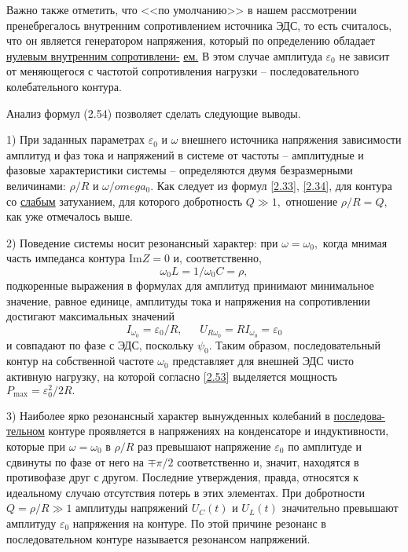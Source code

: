{Важно также отметить, что <<по умолчанию>> в нашем рассмотрении пренебрегалось внут\-ренним сопротивлением источника ЭДС, то есть считалось, что он является \textsf{генератором на\-пряжения,} который по определению обладает \underline{нулевым внутренним со\-про\-тив\-ле\-ни-} \underline{ем.} В этом случае амплитуда $\varepsilon_0$ не зависит от меняющегося с частотой сопротивления нагрузки – последовательного колебательного контура.

Анализ формул (2.54) позволяет сделать следующие выводы.

1) При заданных параметрах $\varepsilon_0$ и $\omega$ внешнего источника напряжения зависимости амплитуд и фаз тока и напряжений в системе от частоты – \textsf{амплитудные} и \textsf{фазовые характеристики сис\-темы} – определяются двумя безразмерными величинами: $\rho/R$ и $\omega/omega_0.$ Как следует из формул \eqref{2.33}, \eqref{2.34}, для контура со \underline{слабым} затуханием, для которого добротность $Q\gg1,$ отношение $\rho/R=Q,$ как уже отмечалось выше.

2) Поведение системы носит резонансный характер: при $\omega=\omega_0,$ когда мнимая часть импеданса контура $\text{Im}Z=0$ и, соответственно,
\setcounter{equation}{54}
\begin{equation}\label{2.55}
	\omega_0L=1/\omega_0C=\rho,
\end{equation}
подкоренные выражения в формулах для амплитуд принимают минимальное значение, равное единице, амплитуды тока и напряжения на сопротивлении достигают максимальных значений
\begin{equation}\label{2.56}
	I_{\omega_0}=\varepsilon_0/R,~~~~~~~U_{R\omega_0}=RI_{\omega_0}=\varepsilon_0
\end{equation}
и совпадают по фазе с ЭДС, поскольку $\psi_0.$ Таким образом, последовательный контур на собственной частоте $\omega_0$ представляет для внешней ЭДС чисто активную нагрузку, на которой согласно \eqref{2.53} выделяется мощность $P_{\text{max}}=\varepsilon_0^2/2R.$

3) Наиболее ярко резонансный характер вынужденных колебаний в \underline{пос\-ле\-до\-ва-} \underline{тель\-ном} контуре проявляется в напряжениях на конденсаторе и индуктивности, которые при $\omega=\omega_0$ в $\rho/R$ раз превышают напряжение $\varepsilon_0$ по амплитуде и сдвинуты по фазе от него на $\mp\pi/2$ соответственно и, значит, находятся в противофазе друг с другом. Последние утверждения, правда, относятся к идеальному случаю отсутствия потерь в этих элементах. При добротности $Q=\rho/R\gg1$ ам\-плитуды напряжений $U_C(t)$ и $U_L(t)$ значительно превышают амплитуду $\varepsilon_0$ напряжения на контуре. По этой причине резонанс в последовательном контуре называется \textsf{резонансом напря\-жений.}

}
